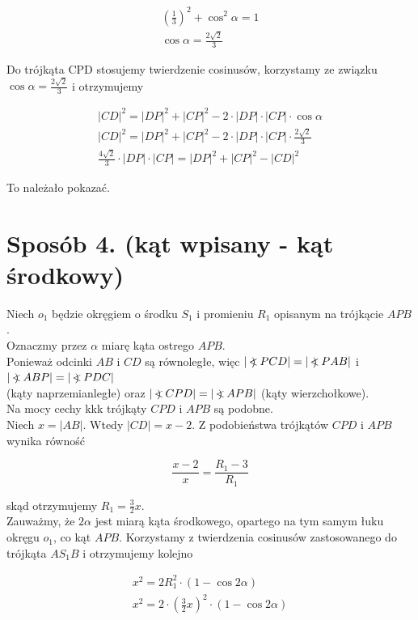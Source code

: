 \documentclass[10pt]{article}
\newcommand\Varangle{\mathop{{<\!\!\!\!\!\text{\small)}}\:}\nolimits}
\begin{document}
$$
\begin{gathered}
\left(\frac{1}{3}\right)^{2}+\cos ^{2} \alpha=1 \\
\cos \alpha=\frac{2 \sqrt{2}}{3}
\end{gathered}
$$

Do trójkąta CPD stosujemy twierdzenie cosinusów, korzystamy ze związku $\cos \alpha=\frac{2 \sqrt{2}}{3}$ i otrzymujemy

$$
\begin{gathered}
|C D|^{2}=|D P|^{2}+|C P|^{2}-2 \cdot|D P| \cdot|C P| \cdot \cos \alpha \\
|C D|^{2}=|D P|^{2}+|C P|^{2}-2 \cdot|D P| \cdot|C P| \cdot \frac{2 \sqrt{2}}{3} \\
\frac{4 \sqrt{2}}{3} \cdot|D P| \cdot|C P|=|D P|^{2}+|C P|^{2}-|C D|^{2}
\end{gathered}
$$

To należało pokazać.

\section*{Sposób 4. (kąt wpisany - kąt środkowy)}
Niech $o_{1}$ będzie okręgiem o środku $S_{1}$ i promieniu $R_{1}$ opisanym na trójkącie $A P B$.\\
Oznaczmy przez $\alpha$ miarę kąta ostrego $A P B$.\\
Ponieważ odcinki $A B$ i $C D$ są równoległe, więc $|\Varangle P C D|=|\Varangle P A B|$ i $|\Varangle A B P|=|\Varangle P D C|$\\
(kąty naprzemianległe) oraz $|\Varangle C P D|=|\Varangle A P B|$ (kąty wierzchołkowe).\\
Na mocy cechy kkk trójkąty $C P D$ i $A P B$ są podobne.\\
Niech $x=|A B|$. Wtedy $|C D|=x-2$. Z podobieństwa trójkątów $C P D$ i $A P B$ wynika równość

$$
\frac{x-2}{x}=\frac{R_{1}-3}{R_{1}}
$$

skąd otrzymujemy $R_{1}=\frac{3}{2} x$.\\
Zauważmy, że $2 \alpha$ jest miarą kąta środkowego, opartego na tym samym łuku okręgu $o_{1}$, co kąt $A P B$. Korzystamy z twierdzenia cosinusów zastosowanego do trójkąta $A S_{1} B$ i otrzymujemy kolejno

$$
\begin{gathered}
x^{2}=2 R_{1}^{2} \cdot(1-\cos 2 \alpha) \\
x^{2}=2 \cdot\left(\frac{3}{2} x\right)^{2} \cdot(1-\cos 2 \alpha)
\end{gathered}
$$
\end{document}
